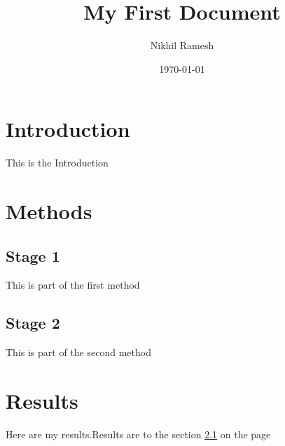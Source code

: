 \documentclass[a4paper,12pt]{article}
\begin{document}
\title{My First Document}
\author{Nikhil Ramesh}
\date{\today}
\maketitle

\tableofcontents
\newpage
{}

\section{Introduction}
This is the Introduction 

\section{Methods}

\subsection{Stage 1}
\label{sec1}
This is part of the first method

\subsection{Stage 2}
This is part of the second method

\section{Results}
Here are my results.Results are to the section \ref{sec1} on the page \pageref{sec1}
\end{document}
